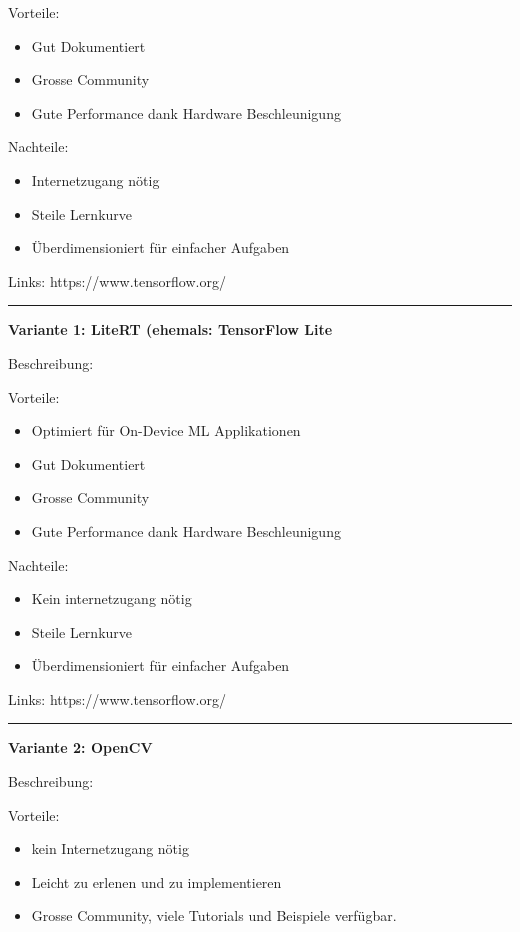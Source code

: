 Vorteile:
\begin{itemize}
    \item Gut Dokumentiert
    \item Grosse Community
    \item Gute Performance dank Hardware Beschleunigung
\end{itemize}


Nachteile:
\begin{itemize}
    \item Internetzugang nötig
    \item Steile Lernkurve
    \item Überdimensioniert für einfacher Aufgaben
\end{itemize}

Links: https://www.tensorflow.org/

\vspace{5pt}
\hrule

\textbf{Variante 1: LiteRT (ehemals: TensorFlow Lite}

Beschreibung:

Vorteile:
\begin{itemize}
    \item Optimiert für On-Device ML Applikationen
    \item Gut Dokumentiert
    \item Grosse Community
    \item Gute Performance dank Hardware Beschleunigung
\end{itemize}


Nachteile:
\begin{itemize}
    \item Kein internetzugang nötig
    \item Steile Lernkurve
    \item Überdimensioniert für einfacher Aufgaben
\end{itemize}

Links: https://www.tensorflow.org/

\vspace{5pt}
\hrule

\textbf{Variante 2: OpenCV}

Beschreibung:

Vorteile:
\begin{itemize}
    \item kein Internetzugang nötig
    \item Leicht zu erlenen und zu implementieren
    \item Grosse Community, viele Tutorials und Beispiele verfügbar.
\end{itemize}

